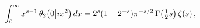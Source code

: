 \[\int_{0}^{\infty}x^{s-1}\mathop{\theta_{2}\/}\nolimits\!\left(0\middle|ix^{2}%
\right)dx=2^{s}(1-2^{-s})\pi^{-s/2}\mathop{\Gamma\/}\nolimits\!\left(\tfrac{1}%
{2}s\right)\mathop{\zeta\/}\nolimits\!\left(s\right),\]